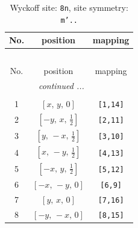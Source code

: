 \documentclass[fleqn,8pt]{jsarticle}
\begin{document}
\begin{longtable}{ccc}
\caption{Wyckoff site: {\tt 8n}, site symmetry: {\tt m'..}}
 \\
 \hline \hline
No. & position & mapping \\ \hline \endfirsthead

\multicolumn{2}{l}{\tablename\ \thetable{}} \\
 \hline \hline
No. & position & mapping \\ \hline \endhead

 \hline \hline
\multicolumn{2}{r}{\footnotesize\it continued ...} \\ \endfoot

 \hline \hline
\multicolumn{2}{r}{} \\ \endlastfoot

1 & $\left[ x,\, y,\, 0 \right]$ & {\tt [1,14]} \\ \hline
2 & $\left[ - y,\, x,\, \frac{1}{2} \right]$ & {\tt [2,11]} \\ \hline
3 & $\left[ y,\, - x,\, \frac{1}{2} \right]$ & {\tt [3,10]} \\ \hline
4 & $\left[ x,\, - y,\, \frac{1}{2} \right]$ & {\tt [4,13]} \\ \hline
5 & $\left[ - x,\, y,\, \frac{1}{2} \right]$ & {\tt [5,12]} \\ \hline
6 & $\left[ - x,\, - y,\, 0 \right]$ & {\tt [6,9]} \\ \hline
7 & $\left[ y,\, x,\, 0 \right]$ & {\tt [7,16]} \\ \hline
8 & $\left[ - y,\, - x,\, 0 \right]$ & {\tt [8,15]} \\
\end{longtable}
\renewcommand{\arraystretch}{1.2}
\end{document}
